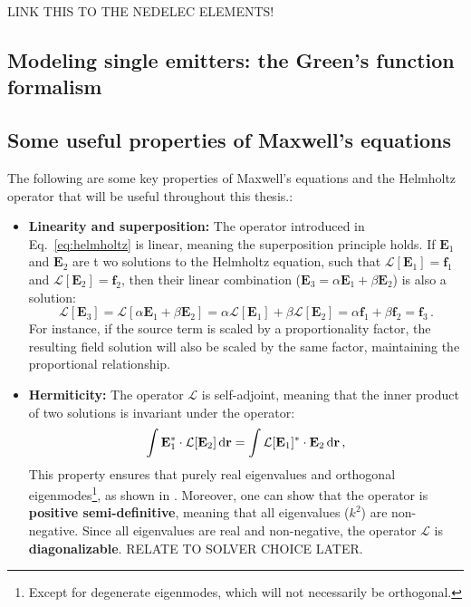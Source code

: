  LINK THIS TO THE NEDELEC ELEMENTS!

\subsection*{Modeling single emitters: the Green's function formalism}

\subsection*{Some useful properties of Maxwell's equations}
The following are some key properties of Maxwell's equations and the Helmholtz operator that will be useful throughout this thesis.:
\begin{itemize}
    \item \textbf{Linearity and superposition:} The operator introduced in Eq.~\eqref{eq:helmholtz} is linear, meaning the superposition principle holds. If $\mathbf{E}_1$ and $\mathbf{E}_2$ are t
    wo solutions to the Helmholtz equation, such that $\mathcal{L}[\mathbf{E}_1] = \mathbf{f}_1$ and 
    $\mathcal{L}[\mathbf{E}_2] = \mathbf{f}_2$, then their linear combination ($\mathbf{E}_3 = \alpha \mathbf{E}_1 + \beta \mathbf{E}_2$) 
    is also a solution:
    \begin{equation}
        \mathcal{L}[\mathbf{E}_3] = \mathcal{L}[\alpha \mathbf{E}_1 + \beta \mathbf{E}_2] = \alpha \mathcal{L}[\mathbf{E}_1] + \beta \mathcal{L}[\mathbf{E}_2] = \alpha \mathbf{f}_1 + \beta \mathbf{f}_2 = \mathbf{f}_3\,.
    \end{equation}
    For instance, if the source term is scaled by a proportionality factor, the resulting field solution will also be scaled by the same factor, maintaining the proportional relationship. 

    \item \textbf{Hermiticity:} The operator $\mathcal{L}$ is self-adjoint, meaning that the inner product of two solutions is invariant under the operator:
    \begin{equation}
        \int \mathbf{E}_1^* \cdot \mathcal{L}[\mathbf{E}_2] \mathop{}\!\text{d} \mathbf{r} = \int \mathcal{L}[\mathbf{E}_1]^* \cdot \mathbf{E}_2 \mathop{}\!\text{d} \mathbf{r}\,,
    \end{equation}
    This property ensures that purely real eigenvalues and orthogonal eigenmodes\footnote{Except for degenerate eigenmodes, which will not necessarily be orthogonal.}, as shown in \cite{phot_crys}. Moreover,
    one can show that the operator is \textbf{positive semi-definitive}, meaning that all eigenvalues ($k^2$) are non-negative. Since all eigenvalues are real and non-negative, the operator $\mathcal{L}$ is \textbf{diagonalizable}.
    RELATE TO SOLVER CHOICE LATER.
    

\end{itemize}
